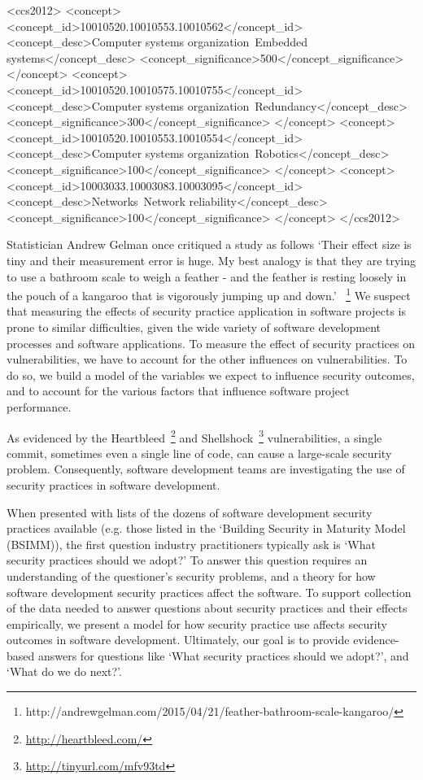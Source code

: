 
%
%
\begin{CCSXML}
	<ccs2012>
	<concept>
	<concept_id>10010520.10010553.10010562</concept_id>
	<concept_desc>Computer systems organization~Embedded systems</concept_desc>
	<concept_significance>500</concept_significance>
	</concept>
	<concept>
	<concept_id>10010520.10010575.10010755</concept_id>
	<concept_desc>Computer systems organization~Redundancy</concept_desc>
	<concept_significance>300</concept_significance>
	</concept>
	<concept>
	<concept_id>10010520.10010553.10010554</concept_id>
	<concept_desc>Computer systems organization~Robotics</concept_desc>
	<concept_significance>100</concept_significance>
	</concept>
	<concept>
	<concept_id>10003033.10003083.10003095</concept_id>
	<concept_desc>Networks~Network reliability</concept_desc>
	<concept_significance>100</concept_significance>
	</concept>
	</ccs2012>  
\end{CCSXML}



Statistician Andrew Gelman once critiqued a study as follows `Their effect size is tiny and their measurement error is huge. My best analogy is that they are trying to use a bathroom scale to weigh a feather - and the feather is resting loosely in the pouch of a kangaroo that is vigorously jumping up and down.' ~\footnote{http://andrewgelman.com/2015/04/21/feather-bathroom-scale-kangaroo/} We suspect that measuring the effects of security practice application in software projects is prone to similar difficulties, given the wide variety of software development processes and software applications. To measure the effect of security practices on vulnerabilities, we have to account for the other influences on vulnerabilities. To do so, we build a model of the variables we expect to influence security outcomes, and to account for the various factors that influence software project performance.


As evidenced by the Heartbleed~\footnote{\url{http://heartbleed.com/}} and Shellshock~\footnote{\url{http://tinyurl.com/mfv93td}} vulnerabilities, a single commit, sometimes even a single line of code, can cause a large-scale security problem.  Consequently, software development teams are investigating the use of security practices in software development.

 When presented with lists of the dozens of software development security practices available (e.g. those listed in the `Building Security in Maturity Model ~\cite{mcgraw2013bsimm} (BSIMM)), the first question industry practitioners typically ask is `What security practices should we  adopt?'  To answer this question requires an understanding of the questioner's security problems, and a theory for how software development security practices affect the software. To support collection of the data needed to answer questions about security practices and their effects empirically, we present a model for how security practice use affects security outcomes in software development.  Ultimately, our goal is to provide evidence-based answers for questions like `What security practices should we adopt?', and `What do we do next?'.
 
